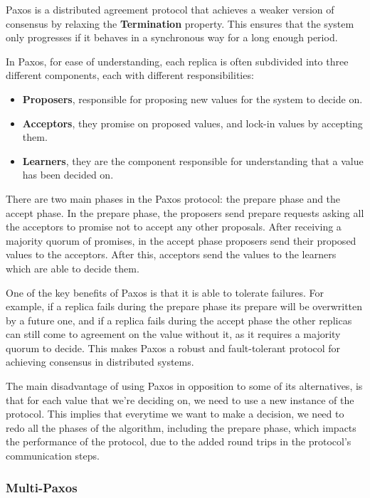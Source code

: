 \documentclass[sigconf]{acmart}
\begin{document}
Paxos is a distributed agreement protocol that achieves a weaker version of consensus by relaxing the \textbf{Termination} property. This ensures that the system only progresses if it behaves in a synchronous way for a long enough period.

In Paxos, for ease of understanding, each replica is often subdivided into three different components, each with different responsibilities:

\begin{itemize}
    \item \textbf{Proposers}, responsible for proposing new values for the system to decide on.
    \item \textbf{Acceptors}, they promise on proposed values, and lock-in values by accepting them.
    \item \textbf{Learners}, they are the component responsible for understanding that a value has been decided on. 
\end{itemize}

There are two main phases in the Paxos protocol: the prepare phase and the accept phase. In the prepare phase, the proposers send prepare requests asking all the acceptors to promise not to accept any other proposals. After receiving a majority quorum of promises, in the accept phase proposers send their proposed values to the acceptors. After this, acceptors send the values to the learners which are able to decide them.

One of the key benefits of Paxos is that it is able to tolerate failures. For example, if a replica fails during the prepare phase its prepare will be overwritten by a future one, and if a replica fails during the accept phase the other replicas can still come to agreement on the value without it, as it requires a majority quorum to decide. This makes Paxos a robust and fault-tolerant protocol for achieving consensus in distributed systems.

The main disadvantage of using Paxos in opposition to some of its alternatives, is that for each value that we're deciding on, we need to use a new instance of the protocol. This implies that everytime we want to make a decision, we need to redo all the phases of the algorithm, including the prepare phase, which impacts the performance of the protocol, due to the added round trips in the protocol's communication steps. 

\subsubsection{Multi-Paxos}
\end{document}
